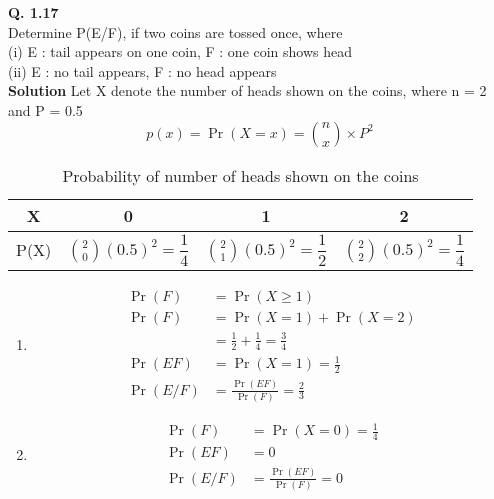 \documentclass[journal,12pt,twocoloums]{IEEEtran}
\begin{document}
\maketitle
\noindent 
\textbf{Q. 1.17}\\
Determine P(E/F), if two coins are
tossed once, where\\
(i) E : tail appears on one coin, F : one coin
shows head\\
(ii) E : no tail appears, F : no head appears\vspace{0.5cm}\\
\textbf{Solution}
Let X denote the number of heads shown on the coins, where n = 2 and P = 0.5
$$p(x) = \Pr(X=x) = \binom{n}{x}\times P^2$$ 
\begin{table}[H]
\resizebox{9cm}{0.8cm} {
\begin{tabular}{|c|c|c|c|}
\hline
     X&0&1&2  \\
     \hline
     P(X)&$\binom{2}{0}(0.5)^2=\dfrac{1}{4}$&$\binom{2}{1}(0.5)^2 = \dfrac{1}{2}$&$\binom{2}{2}(0.5)^2 = \dfrac{1}{4}$\\
     \hline
\end{tabular}
}
\caption{Probability of number of heads shown on the coins }
\label{table:1}
\end{table}
\begin{enumerate}[label=\roman*]
\item 
\begin{align}
\Pr(F) &= \Pr(X\geq 1)\\
\Pr(F) &= \Pr(X = 1) + \Pr(X = 2)\\
       &= \frac{1}{2} + \frac{1}{4} = \frac{3}{4}\nonumber\\
\Pr(EF) &= \Pr(X = 1) = \frac{1}{2}\\
\Pr(E/F) &=\frac{\Pr(EF)}{\Pr(F)} = \frac{2}{3}
\end{align}
\item
\begin{align}
\Pr(F) &= \Pr(X = 0) = \frac{1}{4}\\
\Pr(EF) &= 0\\
\Pr(E/F) &= \frac{\Pr(EF)}{\Pr(F)} = 0
\end{align} 
\end{enumerate}





\end{document}
